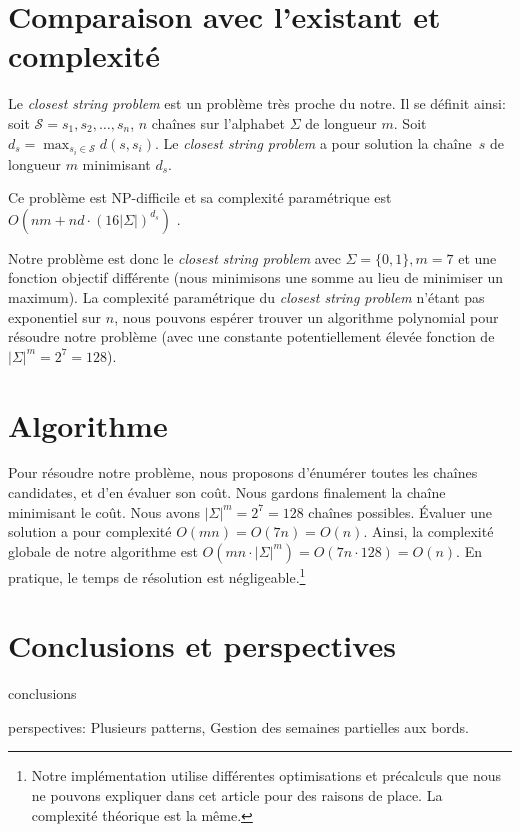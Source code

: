 \documentclass{roadef}
\def\S{\mathcal{S}}
\begin{document}
\section{Comparaison avec l'existant et complexité}

Le \emph{closest string problem} est un problème très proche du notre.
Il se définit ainsi: soit $\S = s_1, s_2, \ldots, s_n$, $n$ chaînes
sur l'alphabet $\Sigma$ de longueur $m$.  Soit $d_s = \max_{s_i\in\S}
d(s, s_i)$. Le \emph{closest string problem} a pour solution la
chaîne~$s$ de longueur $m$ minimisant $d_s$.

Ce problème est NP-difficile \cite{lanctot2003distinguishing} et sa
complexité paramétrique est
\begin{math}
  O(nm + nd\cdot(16|\Sigma|)^{d_s})
\end{math}
\cite{ma2008more}.

Notre problème est donc le \emph{closest string problem} avec $\Sigma
= \{0, 1\}, m = 7$ et une fonction objectif différente (nous
minimisons une somme au lieu de minimiser un maximum). La complexité
paramétrique du \emph{closest string problem} n'étant pas exponentiel
sur $n$, nous pouvons espérer trouver un algorithme polynomial pour
résoudre notre problème (avec une constante potentiellement élevée
fonction de $|\Sigma|^m = 2^7 = 128$).

\section{Algorithme}

Pour résoudre notre problème, nous proposons d'énumérer toutes les
chaînes candidates, et d'en évaluer son coût. Nous gardons finalement
la chaîne minimisant le coût. Nous avons $|\Sigma|^m = 2^7 = 128$
chaînes possibles. Évaluer une solution a pour complexité $O(mn) =
O(7n) = O(n)$. Ainsi, la complexité globale de notre algorithme est
$O(mn\cdot|\Sigma|^m) = O(7n\cdot128) = O(n)$. En pratique, le temps
de résolution est négligeable.\footnote{Notre implémentation utilise
  différentes optimisations et précalculs que nous ne pouvons
  expliquer dans cet article pour des raisons de place. La complexité
  théorique est la même.}

\section{Conclusions et perspectives}

conclusions

perspectives: Plusieurs patterns, Gestion des semaines partielles aux
bords.



\end{document}
